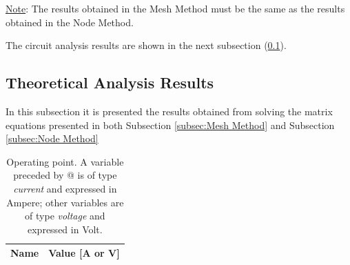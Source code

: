 \underline{Note}: The results obtained in the Mesh Method must be the same as the results obtained in the Node Method.\par

The circuit analysis results are shown in the next subsection (\ref{subsec:Theoretical Analysis Results}).


\subsection{Theoretical Analysis Results}
\label{subsec:Theoretical Analysis Results}\par
In this subsection it is presented the results obtained from solving the matrix equations presented in both Subsection \ref{subsec:Mesh Method} and Subsection \ref{subsec:Node Method}
\begin{table} [H]
  \centering
  \begin{tabular}{|l|r|}
    \hline    
    {\bf Name} & {\bf Value [A or V]} \\ \hline
    
  \end{tabular}
  \caption{Operating point. A variable preceded by @ is of type {\em current}
    and expressed in Ampere; other variables are of type {\it voltage} and expressed in
    Volt.}
  \label{tab:op_analysis}
\end{table}

